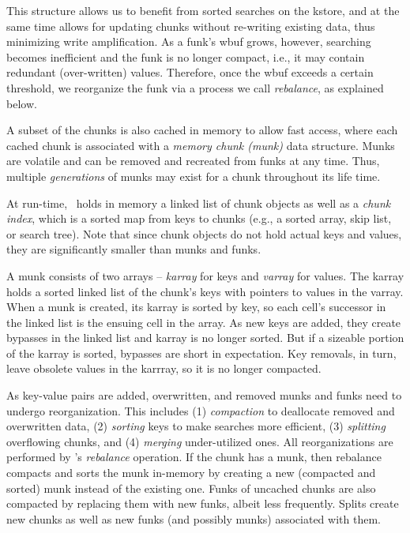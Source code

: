 This structure allows us to benefit from sorted searches on the kstore, and at the same time
allows for updating chunks without re-writing existing data, thus minimizing write amplification.
As a funk's wbuf grows, however, searching becomes inefficient   and  
the funk is no longer compact, i.e., it may contain redundant (over-written) values.
Therefore, once the wbuf exceeds a certain threshold, we reorganize the funk
via a process we call \emph{rebalance}, as explained below.



A subset of the chunks is also cached in memory to allow fast access, where each cached chunk is associated with a
\emph{memory chunk (munk)}  data structure. 
Munks are volatile and can be removed and recreated from funks at any time.
Thus, multiple \emph{generations} of munks may exist for a chunk throughout its life time.


At run-time, \sys\ holds in memory a linked list of chunk objects as well as 
a \emph{chunk index}, which is a sorted map from keys to chunks (e.g., a sorted array, skip list, or search tree).
Note that since chunk objects do not hold actual keys and values, they are significantly smaller than munks and funks. 


A munk consists of two arrays -- \emph{karray} for keys and \emph{varray} for values. The karray holds a sorted linked list of the chunk's keys
with pointers to values in the varray. 
When a munk is created, its karray is sorted by key, so each cell's successor in the linked list is the ensuing cell in the array.
As new keys are added, they create bypasses in the linked list and karray is no longer sorted.
But if a sizeable portion of the karray is sorted, bypasses are short in expectation.
Key removals, in turn, leave obsolete values in the karrray, so it is no longer compacted.

As key-value pairs are added, overwritten, and removed munks and funks need to undergo reorganization. This includes  
(1) \emph{compaction} to deallocate removed and overwritten data, 
(2) \emph{sorting} keys to make searches more efficient,  
(3) \emph{splitting} overflowing chunks, and
(4) \emph{merging} under-utilized ones.
All reorganizations are performed by \sys's \emph{rebalance} operation.
If the chunk has a munk, then rebalance compacts and sorts the munk in-memory by creating a new 
(compacted and sorted) munk instead of the existing one. 
Funks of uncached chunks are also compacted by replacing them with new funks, albeit less frequently.
Splits  create new chunks as well as new  funks (and possibly munks) associated with them.

